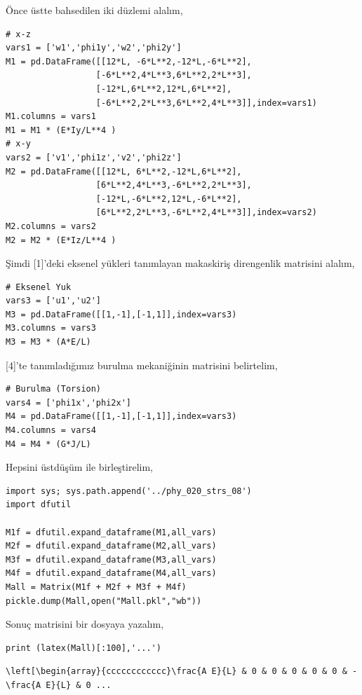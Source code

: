 \documentclass[12pt,fleqn]{article}\usepackage{../../common}
\begin{document}
Önce üstte bahsedilen iki düzlemi alalım,

\begin{verbatim}
# x-z
vars1 = ['w1','phi1y','w2','phi2y']
M1 = pd.DataFrame([[12*L, -6*L**2,-12*L,-6*L**2],
                  [-6*L**2,4*L**3,6*L**2,2*L**3],
                  [-12*L,6*L**2,12*L,6*L**2],
                  [-6*L**2,2*L**3,6*L**2,4*L**3]],index=vars1)
M1.columns = vars1
M1 = M1 * (E*Iy/L**4 )
# x-y
vars2 = ['v1','phi1z','v2','phi2z']
M2 = pd.DataFrame([[12*L, 6*L**2,-12*L,6*L**2],
                  [6*L**2,4*L**3,-6*L**2,2*L**3],
                  [-12*L,-6*L**2,12*L,-6*L**2],
                  [6*L**2,2*L**3,-6*L**2,4*L**3]],index=vars2)
M2.columns = vars2
M2 = M2 * (E*Iz/L**4 )
\end{verbatim}

Şimdi [1]'deki eksenel yükleri tanımlayan makaskiriş direngenlik matrisini
alalım,

\begin{verbatim}
# Eksenel Yuk
vars3 = ['u1','u2']
M3 = pd.DataFrame([[1,-1],[-1,1]],index=vars3)
M3.columns = vars3
M3 = M3 * (A*E/L)
\end{verbatim}

[4]'te tanımladığımız burulma mekaniğinin matrisini belirtelim,

\begin{verbatim}
# Burulma (Torsion)
vars4 = ['phi1x','phi2x']
M4 = pd.DataFrame([[1,-1],[-1,1]],index=vars3)
M4.columns = vars4
M4 = M4 * (G*J/L)
\end{verbatim}

Hepsini üstdüşüm ile birleştirelim,

\begin{verbatim}
import sys; sys.path.append('../phy_020_strs_08')
import dfutil

M1f = dfutil.expand_dataframe(M1,all_vars)
M2f = dfutil.expand_dataframe(M2,all_vars)
M3f = dfutil.expand_dataframe(M3,all_vars)
M4f = dfutil.expand_dataframe(M4,all_vars)
Mall = Matrix(M1f + M2f + M3f + M4f)
pickle.dump(Mall,open("Mall.pkl","wb"))
\end{verbatim}

Sonuç matrisini bir dosyaya yazalım, 

\begin{verbatim}
print (latex(Mall)[:100],'...')
\end{verbatim}

\begin{verbatim}
\left[\begin{array}{cccccccccccc}\frac{A E}{L} & 0 & 0 & 0 & 0 & 0 & - \frac{A E}{L} & 0 ...
\end{verbatim}
\end{document}
